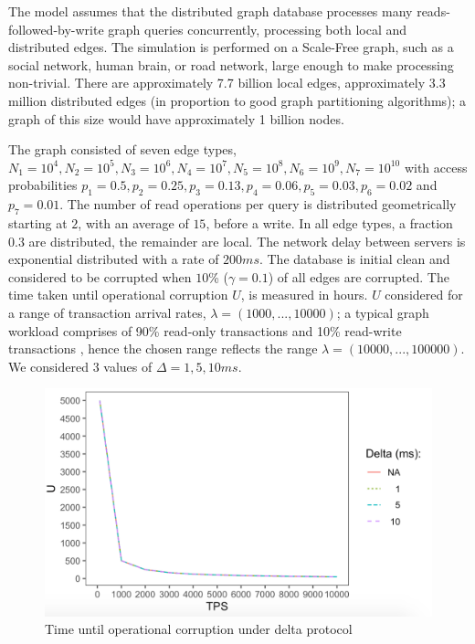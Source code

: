 \documentclass[sigplan,10pt]{acmart}
\begin{document}
The model assumes that the distributed graph database  processes many reads-followed-by-write graph queries concurrently, processing both local and distributed edges. The simulation is performed on a Scale-Free graph, such as a social network, human brain, or road network, large enough to make processing non-trivial. There are approximately 7.7 billion local edges, approximately 3.3 million distributed edges (in proportion to good graph partitioning algorithms); a graph of this size would have approximately 1 billion nodes.

The graph consisted of seven edge types, $N_1=10^4, N_2=10^5, N_3=10^6, N_4=10^7,  N_5=10^8, N_6=10^9, N_7=10^10$ with access probabilities $p_1 =0.5, p_2 =0.25, p_3=0.13, p_4=0.06, p_5=0.03, p_6=0.02$ and $p_7 =0.01$. The number of read operations per query is distributed geometrically starting at $2$, with an average of $15$, before a write. In all edge types, a fraction $0.3$ are distributed, the remainder are local. The network delay between servers is exponential distributed with a rate of $200ms$. The database is initial clean and considered to be corrupted when $10$\% ($\gamma = 0.1$) of all edges are corrupted. The time taken until operational corruption $U$, is measured in hours. $U$ considered for a range of transaction arrival rates, $\lambda = (1000, ..., 10000)$; a typical graph workload comprises of 90\% read-only transactions and 10\% read-write transactions \cite{Angles2020}, hence the chosen range reflects the range $\lambda = (10000, ..., 100000)$. We considered 3 values of $\Delta = 1, 5, 10ms$.

\begin{figure}[h]
  \centering
  \includegraphics[width=\linewidth]{./images/results}
  \caption{Time until operational corruption under delta protocol}
  \label{time-to-corruption-results}
\end{figure}
\end{document}
